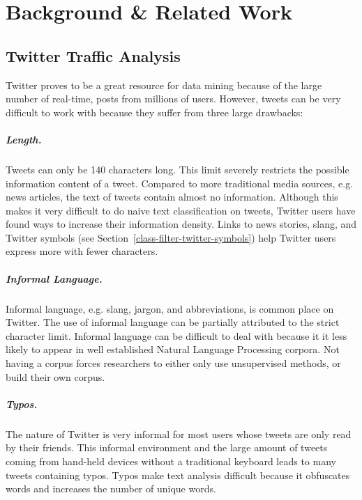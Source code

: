 \documentclass[12pt]{ucthesis}
\begin{document}
\chapter{Background \& Related Work}
\label{background-related-work}


\section{Twitter Traffic Analysis}
\label{background-twitter}
Twitter proves to be a great resource for data mining because of the large number of real-time, posts from millions of users.
However, tweets can be very difficult to work with because they suffer from three large drawbacks:

\paragraph{Length.}
Tweets can only be 140 characters long. This limit severely restricts the possible information content of a tweet.
Compared to more traditional media sources, e.g. news articles, the text of tweets contain almost no information.
Although this makes it very difficult to do naive text classification on tweets, Twitter users have found ways to increase their information density.
Links to news stories, slang, and Twitter symbols (see Section~\ref{class-filter-twitter-symbols}) help Twitter users express more with fewer characters.

\paragraph{Informal Language.}
Informal language, e.g. slang, jargon, and abbreviations, is common place on Twitter.
The use of informal language can be partially attributed to the strict character limit.
Informal language can be difficult to deal with because it it less likely to appear in well established
Natural Language Processing corpora. Not having a corpus forces researchers to either only use unsupervised methods, or
build their own corpus.

\paragraph{Typos.}
The nature of Twitter is very informal for most users whose tweets are only read by their friends.
This informal environment and the large amount of tweets coming from hand-held devices without a traditional keyboard leads to many tweets containing typos.
Typos make text analysis difficult because it obfuscates words and increases the number of unique words.
\end{document}
